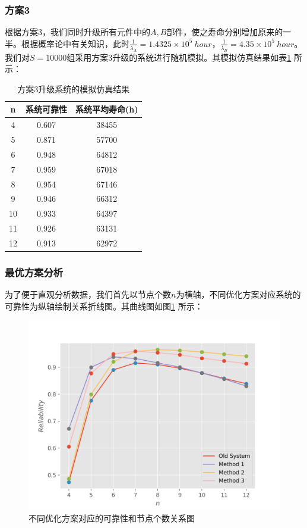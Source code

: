 \documentclass[10.5pt,twocolumn]{jbuaa}
\begin{document}
\subsubsection{方案3}
根据方案3，我们同时升级所有元件中的$A, B$部件，使之寿命分别增加原来的一半。根据概率论中有关知识，此时$\frac{1}{\lambda_A} = 1.4325 \times 10 ^{5}\ hour$，$\frac{1}{\lambda_B} = 4.35 \times 10 ^{5}\ hour$。我们对$S = 10000$组采用方案3升级的系统进行随机模拟。其模拟仿真结果如表\ref{table:5} 所示：
\begin{table}[H]
	\centering
	\label{table:5}
	\caption{方案3升级系统的模拟仿真结果}
	\vspace{0.2cm}
	\begin{tabular}{c|c|c}
	\hline
	n & \kai 系统可靠性 & \kai 系统平均寿命(h) \\
	\hline
	4 & 0.607 & 38455\\
	\hline
	5 & 0.871 & 57700 \\
	\hline
	6 & 0.948 & 64812 \\
	\hline
	7 & 0.959 & 67018 \\
	\hline
	8 & 0.954 & 67146 \\
	\hline
	9 & 0.946 & 66312 \\
	\hline
	10 & 0.933 & 64397 \\
	\hline
	11 & 0.926 & 63131 \\
	\hline
	12 & 0.913 & 62972 \\
	\hline
		
	\end{tabular}
\end{table}
\subsubsection{最优方案分析}
为了便于直观分析数据，我们首先以节点个数$n$为横轴，不同优化方案对应系统的可靠性为纵轴绘制关系折线图。其曲线图如图\ref{fig:6} 所示：
\begin{figure}[H]
	\label{fig:6}
	\includegraphics[scale = 0.6]{fig6}
	\caption{不同优化方案对应的可靠性和节点个数关系图}
\end{figure}
\end{document}
